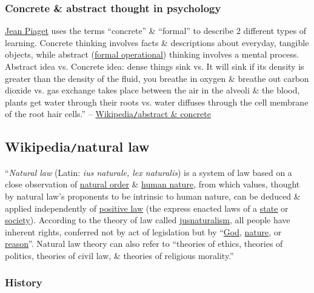 \documentclass{article}
\begin{document}
\subsubsection{Concrete \& abstract thought in psychology}
\href{https://en.wikipedia.org/wiki/Jean_Piaget}{\sc Jean Piaget} uses the terms ``concrete'' \& ``formal'' to describe 2 different types of learning. Concrete thinking involves facts \& descriptions about everyday, tangible objects, while abstract (\href{https://en.wikipedia.org/wiki/Formal_Operational#Formal_operational_stage}{formal operational}) thinking involves a mental process. Abstract idea vs. Concrete idea: dense things sink vs. It will sink if its density is greater than the density of the fluid, you breathe in oxygen \& breathe out carbon dioxide vs. gas exchange takes place between the air in the alveoli \& the blood, plants get water through their roots vs. water diffuses through the cell membrane of the root hair cells.'' -- \href{https://en.wikipedia.org/wiki/Abstract_and_concrete}{Wikipedia{\tt/}abstract \& concrete}


\subsection{Wikipedia{\tt/}natural law}
``{\it Natural law} (Latin: {\it ius naturale, lex naturalis}) is a system of law based on a close observation of \href{https://en.wikipedia.org/wiki/Natural_order_(philosophy)}{natural order} \& \href{https://en.wikipedia.org/wiki/Human_nature}{human nature}, from which values, thought by natural law's proponents to be intrinsic to human nature, can be deduced \& applied independently of \href{https://en.wikipedia.org/wiki/Positive_law}{positive law} (the express enacted laws of a \href{https://en.wikipedia.org/wiki/Sovereign_state}{state} or \href{https://en.wikipedia.org/wiki/Society}{society}). According to the theory of law called \href{https://en.wikipedia.org/wiki/Jusnaturalism}{jusnaturalism}, all people have inherent rights, conferred not by act of legislation but by ``\href{https://en.wikipedia.org/wiki/God}{God}, \href{https://en.wikipedia.org/wiki/Nature}{nature}, or \href{https://en.wikipedia.org/wiki/Reason}{reason}''. Natural law theory can also refer to ``theories of ethics, theories of politics, theories of civil law, \& theories of religious morality.''
	
\subsubsection{History}
\end{document}
